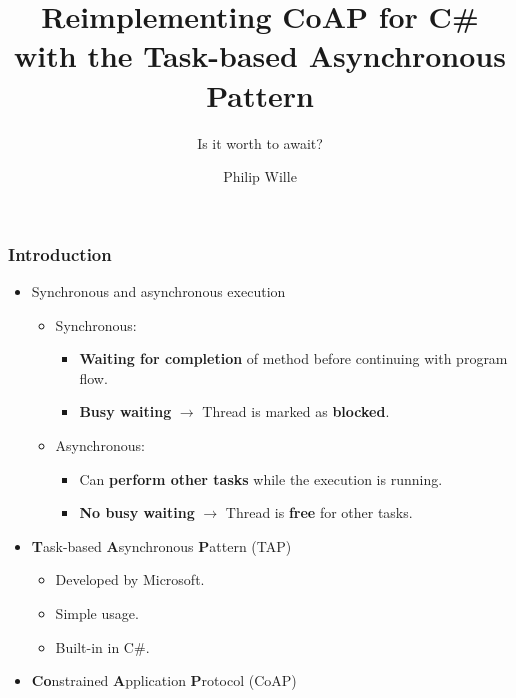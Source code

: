 \documentclass[11pt,t,usepdftitle=false,aspectratio=169,usenames,dvipsnames]{beamer}
\title{Reimplementing CoAP for C\# with the Task-based Asynchronous Pattern}
\subtitle{Is it worth to await?}
\author{Philip Wille}
\begin{document}
    \maketitle{}

    \begin{frame}
        \frametitle{Introduction}
        \begin{itemize}
            \item<1-> Synchronous and asynchronous execution
            \begin{itemize}
                \item<2-> Synchronous:
                \begin{itemize}
                    \item<3-> \textcolor{uibkBlue}{\textbf{Waiting for completion}} of method before continuing with program flow.
                    \item<5-> \textcolor{uibkBlue}{\textbf{Busy waiting}} $\rightarrow$ Thread is marked as \textcolor{uibkBlue}{\textbf{blocked}}.
                \end{itemize}
                \item<2-> Asynchronous:
                \begin{itemize}
                    \item<4-> Can \textcolor{uibkBlue}{\textbf{perform other tasks}} while the execution is running.
                    \item<6-> \textcolor{uibkBlue}{\textbf{No busy waiting}} $\rightarrow$ Thread is \textcolor{uibkBlue}{\textbf{free}} for other tasks.
                \end{itemize}
            \end{itemize}
            \item<7-> \textcolor{uibkBlue}{\textbf{T}}ask-based \textcolor{uibkBlue}{\textbf{A}}synchronous \textcolor{uibkBlue}{\textbf{P}}attern (TAP)
            \begin{itemize}
                \item<8-> Developed by Microsoft.
                \item<9-> Simple usage.
                \item<10-> Built-in in C\#.
            \end{itemize}
            \item<11-> \textcolor{uibkBlue}{\textbf{Co}}nstrained \textcolor{uibkBlue}{\textbf{A}}pplication \textcolor{uibkBlue}{\textbf{P}}rotocol (CoAP)
            \begin{itemize}

\end{itemize}
\end{itemize}
\end{frame}
\end{document}
